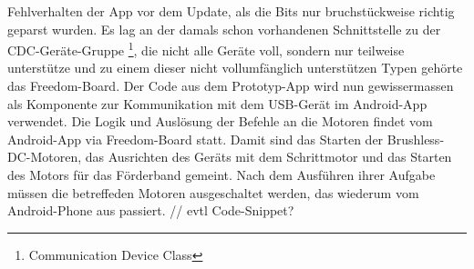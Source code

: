 Fehlverhalten der  App vor dem Update, als die Bits nur bruchstückweise richtig geparst wurden. Es lag 
an der damals schon vorhandenen Schnittstelle zu der CDC-Geräte-Gruppe \footnote{Communication Device Class}, 
die nicht alle Geräte voll, sondern nur teilweise unterstütze und zu einem dieser nicht vollumfänglich 
unterstützen Typen gehörte das Freedom-Board. \newline
Der Code aus dem  Prototyp-App wird nun gewissermassen als Komponente zur Kommunikation mit dem USB-Gerät
im Android-App verwendet. 
\newline
\newline
Die Logik und Auslösung der Befehle an die Motoren findet vom Android-App via Freedom-Board statt. Damit 
sind das Starten der Brushless-DC-Motoren, das Ausrichten des Geräts mit dem Schrittmotor und das Starten 
des Motors für das Förderband gemeint. Nach dem Ausführen ihrer Aufgabe müssen die betreffeden Motoren 
ausgeschaltet werden, das wiederum vom Android-Phone aus passiert.
\newline
\newline
// evtl Code-Snippet?
